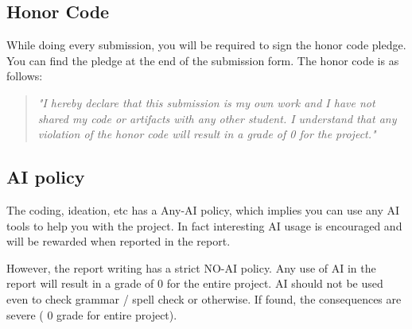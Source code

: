 \documentclass[11pt]{article}
\begin{document}
\subsection{Honor Code}
While doing every submission, you will be required to sign the honor code pledge. You can find the pledge at the end of the submission form. The honor code is as follows:
\begin{quote}
    \textit{"I hereby declare that this submission is my own work and I have not shared my code or artifacts with any other student. I understand that any violation of the honor code will result in a grade of 0 for the project."}
\end{quote}

\subsection{AI policy}
The coding, ideation, etc has a Any-AI policy, which implies you can use any AI tools to help you with the project. In fact interesting AI usage is encouraged and will be rewarded when reported in the report.


However, the report writing has a strict NO-AI policy. Any use of AI in the report will result in a grade of 0 for the entire project. AI should not be used even to check grammar / spell check or otherwise. If found, the consequences are severe ( 0 grade for entire project). 
\end{document}
